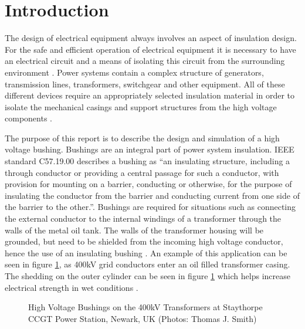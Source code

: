 \section{Introduction} \label{s:into}
The design of electrical equipment always involves an aspect of insulation design.
For the safe and efficient operation of electrical equipment it is necessary to have an electrical circuit and a means of isolating this circuit from the surrounding environment \cite{warne2005newnes}.
Power systems contain a complex structure of generators, transmission lines, transformers, switchgear and other equipment. 
All of these different devices require an appropriately selected insulation material in order to isolate the mechanical casings and support structures from the high voltage components \cite{james2008condition}.

The purpose of this report is to describe the design and simulation of a high voltage bushing. 
Bushings are an integral part of power system insulation. 
IEEE standard C57.19.00 describes a bushing as ``an insulating structure, including a through conductor or providing a central passage for such a conductor, with provision for mounting on a barrier, conducting or otherwise, for the purpose of insulating the conductor from the barrier and conducting current from one side of the barrier to the other.''\cite{1440990}.
Bushings are required for situations such as connecting the external conductor to the internal windings of a transformer through the walls of the metal oil tank.
The walls of the transformer housing will be grounded, but need to be shielded from the incoming high voltage conductor, hence the use of an insulating bushing \cite{warne2005newnes}.
An example of this application can be seen in figure \ref{Figure:BothBushPics}, as 400kV grid conductors enter an oil filled transformer casing.
The shedding on the outer cylinder can be seen in figure \ref{Figure:BothBushPics} which helps increase electrical strength in wet conditions \cite{warne2005newnes}.

\begin{figure}[!htb]
  \centering
\caption{High Voltage Bushings on the 400kV Transformers at Staythorpe CCGT Power Station, Newark, UK (Photos: Thomas J. Smith)}
  \label{Figure:BothBushPics}
\end{figure}
